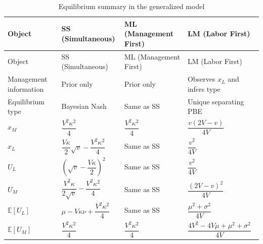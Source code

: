 \documentclass[
  english,
  a4paper,
  12pt]{article}
\newcommand{\E}{\mathbb{E}}
\theoremstyle{plain}
\theoremstyle{plain}
\theoremstyle{definition}
\theoremstyle{remark}
\begin{document}
\begin{longtable}[]{@{}
  >{\raggedright\arraybackslash}p{}
  >{\raggedright\arraybackslash}p{}
  >{\raggedright\arraybackslash}p{}
  >{\raggedright\arraybackslash}p{}@{}}
\caption{Equilibrium summary in the generalized
model}\label{tbl-summary-general}\tabularnewline
\toprule\noalign{}
\begin{minipage}[b]{\linewidth}\raggedright
Object
\end{minipage} & \begin{minipage}[b]{\linewidth}\raggedright
SS (Simultaneous)
\end{minipage} & \begin{minipage}[b]{\linewidth}\raggedright
ML (Management First)
\end{minipage} & \begin{minipage}[b]{\linewidth}\raggedright
LM (Labor First)
\end{minipage} \\
\midrule\noalign{}
\endfirsthead
\toprule\noalign{}
\begin{minipage}[b]{\linewidth}\raggedright
Object
\end{minipage} & \begin{minipage}[b]{\linewidth}\raggedright
SS (Simultaneous)
\end{minipage} & \begin{minipage}[b]{\linewidth}\raggedright
ML (Management First)
\end{minipage} & \begin{minipage}[b]{\linewidth}\raggedright
LM (Labor First)
\end{minipage} \\
\midrule\noalign{}
\endhead
\bottomrule\noalign{}
\endlastfoot
Management information & Prior only & Prior only & Observes \(x_L\) and
infers type \\
Equilibrium type & Bayesian Nash & Same as SS & Unique separating PBE \\
\(x_M\) & \(\dfrac{V^2\kappa^2}{4}\) & \(\dfrac{V^2\kappa^2}{4}\) &
\(\dfrac{v(2V-v)}{4V}\) \\
\(x_L\) & \(\dfrac{V\kappa}{2}\sqrt{v} - \dfrac{V^2\kappa^2}{4}\) & Same
as SS & \(\dfrac{v^2}{4V}\) \\
\(U_L\) & \(\left(\sqrt{v}-\dfrac{V\kappa}{2}\right)^{\!2}\) & Same as
SS & \(\dfrac{v^2}{4V}\) \\
\(U_M\) & \(\dfrac{V^2\kappa}{2\sqrt{v}} - \dfrac{V^2\kappa^2}{4}\) &
Same as SS & \(\dfrac{(2V-v)^2}{4V}\) \\
\(\E[U_L]\) & \(\mu - V\kappa\nu + \dfrac{V^2\kappa^2}{4}\) & Same as SS
& \(\dfrac{\mu^2+\sigma^2}{4V}\) \\
\(\E[U_M]\) & \(\dfrac{V^2\kappa^2}{4}\) & \(\dfrac{V^2\kappa^2}{4}\) &
\(\dfrac{4V^2-4V\mu+\mu^2+\sigma^2}{4V}\) \\
\end{longtable}
\end{document}
